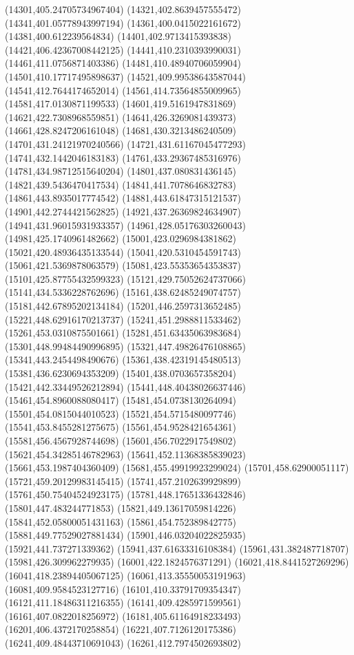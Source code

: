 {(14301,405.24705734967404)
(14321,402.8639457555472)
(14341,401.05778943997194)
(14361,400.0415022161672)
(14381,400.612239564834)
(14401,402.9713415393838)
(14421,406.42367008442125)
(14441,410.2310393990031)
(14461,411.0756871403386)
(14481,410.48940706059904)
(14501,410.17717495898637)
(14521,409.99538643587044)
(14541,412.7644174652014)
(14561,414.73564855009965)
(14581,417.0130871199533)
(14601,419.5161947831869)
(14621,422.7308968559851)
(14641,426.3269081439373)
(14661,428.8247206161048)
(14681,430.3213486240509)
(14701,431.24121970240566)
(14721,431.61167045477293)
(14741,432.1442046183183)
(14761,433.29367485316976)
(14781,434.98712515640204)
(14801,437.080831436145)
(14821,439.5436470417534)
(14841,441.7078646832783)
(14861,443.8935017774542)
(14881,443.61847315121537)
(14901,442.2744421562825)
(14921,437.26369824634907)
(14941,431.96015931933357)
(14961,428.05176303260043)
(14981,425.1740961482662)
(15001,423.0296984381862)
(15021,420.48936435133544)
(15041,420.5310454591743)
(15061,421.5369878063579)
(15081,423.55353654353837)
(15101,425.87755432599323)
(15121,429.75052624737066)
(15141,434.5336228762696)
(15161,438.62485249074757)
(15181,442.67895202134184)
(15201,446.2597313652485)
(15221,448.62916170213737)
(15241,451.2988811533462)
(15261,453.0310875501661)
(15281,451.63435063983684)
(15301,448.99484490996895)
(15321,447.49826476108865)
(15341,443.2454498490676)
(15361,438.42319145480513)
(15381,436.6230694353209)
(15401,438.0703657358204)
(15421,442.33449526212894)
(15441,448.40438026637446)
(15461,454.8960088080417)
(15481,454.0738130264094)
(15501,454.0815044010523)
(15521,454.5715480097746)
(15541,453.8455281275675)
(15561,454.9528421654361)
(15581,456.4567928744698)
(15601,456.7022917549802)
(15621,454.34285146782963)
(15641,452.11368385839023)
(15661,453.1987404360409)
(15681,455.49919923299024)
(15701,458.62900051117)
(15721,459.20129983145415)
(15741,457.2102639929899)
(15761,450.75404524923175)
(15781,448.17651336432846)
(15801,447.483244771853)
(15821,449.13617059814226)
(15841,452.05800051431163)
(15861,454.752389842775)
(15881,449.77529027881434)
(15901,446.03204022825935)
(15921,441.737271339362)
(15941,437.61633316108384)
(15961,431.382487718707)
(15981,426.309962279935)
(16001,422.1824576371291)
(16021,418.8441527269296)
(16041,418.23894405067125)
(16061,413.35550053191963)
(16081,409.9584523127716)
(16101,410.33791709354347)
(16121,411.18486311216355)
(16141,409.4285971599561)
(16161,407.0822018256972)
(16181,405.61164918233493)
(16201,406.4372170258854)
(16221,407.7126120175386)
(16241,409.48443710691043)
(16261,412.7974502693802)
}
